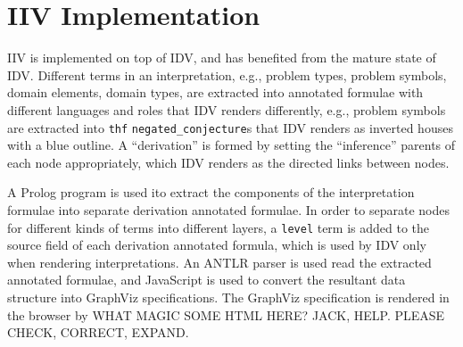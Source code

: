 \documentclass[letterpaper]{article}
\newcommand{\smalltt}[1]{\small \texttt{#1}}
\begin{document}
\section{IIV Implementation}
\label{Implementation}

IIV is implemented on top of IDV, and has benefited from the mature state of IDV.
Different terms in an interpretation, e.g., problem types, problem symbols, domain elements,
domain types, are extracted into annotated formulae with different languages and roles that
IDV renders differently, e.g., problem symbols are extracted into {\smalltt{thf}} 
{\smalltt{negated\_conjecture}}s that IDV renders as inverted houses with a blue outline.
A ``derivation'' is formed by setting the ``inference'' parents of each node appropriately,
which IDV renders as the directed links between nodes.

A Prolog program is used ito extract the components of the interpretation formulae into 
separate derivation annotated formulae.
In order to separate nodes for different kinds of terms into different layers, a {\smalltt{level}}
term is added to the source field of each derivation annotated formula, which is used by IDV only
when rendering interpretations.
An ANTLR parser is used read the extracted annotated formulae, and JavaScript is used to convert
the resultant data structure into GraphViz \cite{EG+02} specifications.
The GraphViz specification is rendered in the browser by 
WHAT MAGIC SOME HTML HERE? JACK, HELP. PLEASE CHECK, CORRECT, EXPAND.
\end{document}
